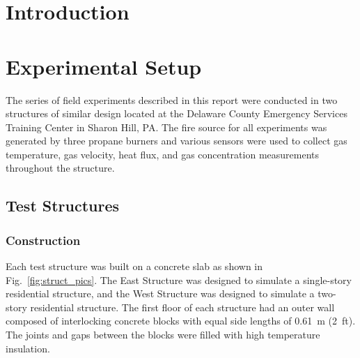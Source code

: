\documentclass[12pt,oneside]{book}
\begin{document}
\mainmatter

\chapter{Introduction}
\label{chap:Introduction}

\chapter{Experimental Setup}
\label{chap:Experimental_Setup}
The series of field experiments described in this report were conducted in two structures of similar design located at the Delaware County Emergency Services Training Center in Sharon Hill, PA. The fire source for all experiments was generated by three propane burners and various sensors were used to collect gas temperature, gas velocity, heat flux, and gas concentration measurements throughout the structure.

\section{Test Structures}
\label{sec:Test_Structures}

\subsection{Construction}
\label{sec:construction}
Each test structure was built on a concrete slab as shown in Fig.~\ref{fig:struct_pics}. The East Structure was designed to simulate a single-story residential structure, and the West Structure was designed to simulate a two-story residential structure. The first floor of each structure had an outer wall composed of interlocking concrete blocks with equal side lengths of 0.61~m (2~ft). The joints and gaps between the blocks were filled with high temperature insulation.
\end{document}
